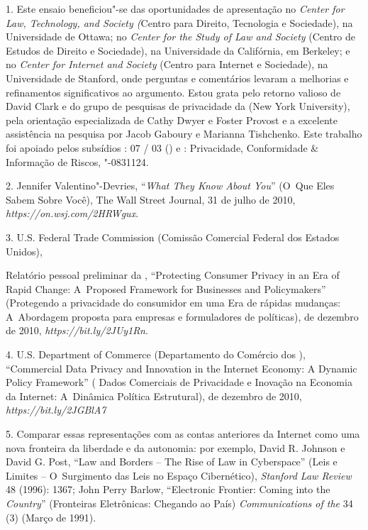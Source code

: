 \begin{Parskip}
1. Este ensaio beneficiou"-se das oportunidades de apresentação no
\emph{Center for Law, Technology, and Society (}Centro para Direito,
Tecnologia e Sociedade), na Universidade de Ottawa; no \emph{Center for
the Study of Law and Society} (Centro de Estudos de Direito e
Sociedade), na Universidade da Califórnia, em Berkeley; e no
\emph{Center for Internet and Society} (Centro para Internet e
Sociedade), na Universidade de Stanford, onde perguntas e comentários
levaram a melhorias e refinamentos significativos ao argumento. Estou
grata pelo retorno valioso de David Clark e do grupo de pesquisas de
privacidade da  (New York University), pela orientação especializada
de Cathy Dwyer e Foster Provost e a excelente assistência na pesquisa
por Jacob Gaboury e Marianna Tishchenko. Este trabalho foi apoiado pelos
subsídios :  07 / 03 () e
 : Privacidade,
Conformidade \& Informação de Riscos, "-0831124.

2. Jennifer Valentino"-Devries, ``\emph{What They Know About You}'' (O~Que
Eles Sabem Sobre Você), The Wall Street Journal, 31 de julho de 2010,
\emph{https://on.wsj.com/2HRWgux}.

3. U.S. Federal Trade Commission (Comissão Comercial Federal dos Estados
Unidos),

Relatório pessoal preliminar da , ``Protecting Consumer Privacy in an
Era of Rapid Change: A~Proposed Framework for Businesses and
Policymakers'' (Protegendo a privacidade do consumidor em uma Era de
rápidas mudanças: A~Abordagem proposta para empresas e formuladores de
políticas), de dezembro de 2010,
\emph{https://bit.ly/2JUy1Rn}.

4. U.S. Department of Commerce (Departamento do Comércio dos ),
``Commercial Data Privacy and Innovation in the Internet Economy: A
Dynamic Policy Framework'' ( Dados Comerciais de Privacidade e Inovação
na Economia da Internet: A~Dinâmica Política Estrutural), de dezembro de
2010,
\emph{https://bit.ly/2JGBlA7}

5. Comparar essas representações com as contas anteriores da Internet
como uma nova fronteira da liberdade e da autonomia: por exemplo, David
R. Johnson e David G. Post, ``Law and Borders -- The Rise of Law in
Cyberspace'' (Leis e Limites -- O~Surgimento das Leis no Espaço
Cibernético), \emph{Stanford Law Review} 48 (1996): 1367; John Perry
Barlow, ``Electronic Frontier: Coming into the \emph{Country}''
(Fronteiras Eletrônicas: Chegando ao País) \emph{Communications of the
} 34 (3) (Março de 1991).


\end{Parskip}

